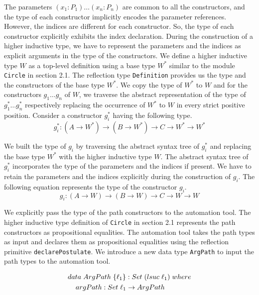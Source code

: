 \documentclass[sigplan,10pt]{acmart}
\begin{document}
The parameters $(x_1:P_1)\ldots(x_n:P_n)$ are common to all the constructors, and the type of each constructor implicitly encodes the parameter references. However, the indices are different for each constructor. So, the type of each constructor explicitly exhibits the index declaration. During the construction of a higher inductive type, we have to represent the parameters and the indices as explicit arguments in the type of the constructors. We define a higher inductive type $W$ as a top-level definition using a base type $W^*$ similar to the module {\tt Circle} in section 2.1. The reflection type {\tt Definition} provides us the type and the constructors of the base type $W^*$. We copy the type of $W^*$ to $W$ and for the constructors $g_1 \ldots g_n$ of $W$, we traverse the abstract representation of the type of $g_1^* \ldots g_n^*$ respectively replacing the occurrence of $W^*$ to $W$ in every strict positive position. Consider a constructor $g_i^*$ having the following type.
\begin{equation}
g_i^* : (A \rightarrow W^*) \rightarrow (B \rightarrow W^*) \rightarrow C \rightarrow W^* \rightarrow W^* \nonumber
\end{equation}

We built the type of $g_i$ by traversing the abstract syntax tree of $g_i^*$ and replacing the base type $W^*$ with the higher inductive type $W$. The abstract syntax tree of $g_i^*$ incorporates the type of the parameters and the indices if present. We have to retain the parameters and the indices explicitly during the construction of $g_i$. The following equation represents the type of the constructor $g_i$.
\begin{equation}
g_i : (A \rightarrow W) \rightarrow (B \rightarrow W) \rightarrow C \rightarrow W \rightarrow W \nonumber
\end{equation}

We explicitly pass the type of the path constructors to the automation tool. The higher inductive type definition of {\tt Circle} in section 2.1 represents the path constructors as propositional equalities. The automation tool takes the path types as input and declares them as propositional equalities using the reflection primitive {\tt declarePostulate}. We introduce a new data type {\tt ArgPath} to input the path types to the automation tool. 
\begin{center}
\begingroup
\fontsize{7.9pt}{0pt}\selectfont
\begin{align}
& data \hspace {0.1cm} ArgPath \hspace {0.1cm} \{\ell_1\} : Set \hspace {0.1cm} (lsuc \hspace {0.1cm} \ell_1) \hspace {0.1cm} where \nonumber \\
& \hspace {0.4cm} argPath : Set \hspace {0.1cm} \ell_1 \rightarrow ArgPath \nonumber \\ \nonumber
\end{align}
\endgroup
\end{center}
\normalsize
\end{document}
